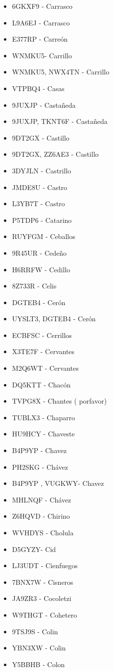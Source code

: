 \begin{itemize}[leftmargin=*,nosep]
\item 6GKXF9 - Carrasco
\item L9A6EJ - Carrasco
\item E377RP  -  Carreón
\item WNMKU5- Carrillo
\item WNMKU5, NWX4TN - Carrillo
\item VTPBQ4  -  Casas
\item 9JUXJP - Castañeda
\item 9JUXJP, TKNT6F - Castañeda
\item 9DT2GX  - Castillo
\item 9DT2GX, ZZ6AE3 - Castillo
\item 3DYJLN - Castrillo
\item JMDE8U  -  Castro
\item L3YB7T  -  Castro
\item P5TDP6 - Catarino
\item RUYFGM - Ceballos
\item 9R45UR - Cedeño
\item H6RRFW - Cedillo
\item 8Z733R  -  Celis
\item DGTEB4 - Cerón
\item UYSLT3, DGTEB4 - Cerón
\item ECBFSC - Cerrillos
\item X3TE7F - Cervantes
\item M2Q6WT - Cervantes
\item DQ5KTT - Chacón
\item TVPG8X - Chantes ( porfavor)
\item TUBLX3 - Chaparro
\item HU9HCY - Chaveste
\item B4P9YP  -  Chavez
\item PH2SKG  -  Chávez
\item B4P9YP , VUGKWY- Chavez
\item MHLNQF - Chávez
\item Z6HQVD - Chirino
\item WVHDYS  -  Cholula
\item D5GYZY-  Cid
\item LJ3UDT - Cienfuegos
\item 7BNX7W  -  Cisneros
\item JA9ZR3 - Cocoletzi
\item W9THGT - Cohetero
\item 9TSJ9S - Colin
\item YBN3XW  -  Colin
\item Y5BBHB - Colon

\end{itemize}
